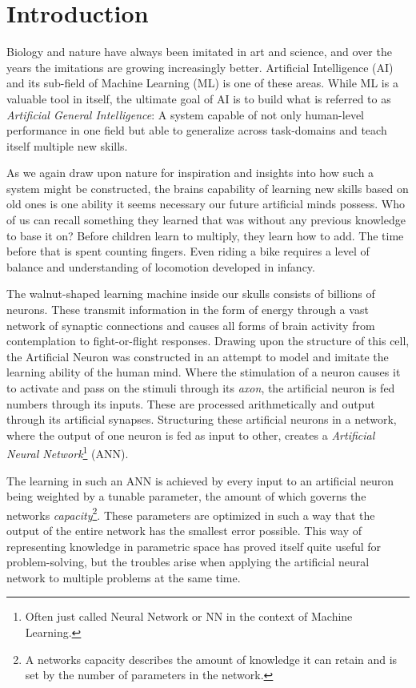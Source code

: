\chapter{Introduction}

Biology and nature have always been imitated in art and science, and over the years the imitations are growing increasingly better. Artificial Intelligence (AI) and its sub-field of Machine Learning (ML) is one of these areas. While ML is a valuable tool in itself, the ultimate goal of AI is to build what is referred to as \textit{Artificial General Intelligence}: A system capable of not only human-level performance in one field but able to generalize across task-domains and teach itself multiple new skills. 

As we again draw upon nature for inspiration and insights into how such a system might be constructed, the brains capability of learning new skills based on old ones is one ability it seems necessary our future artificial minds possess. Who of us can recall something they learned that was without any previous knowledge to base it on? Before children learn to multiply, they learn how to add. The time before that is spent counting fingers. Even riding a bike requires a level of balance and understanding of locomotion developed in infancy.

The walnut-shaped learning machine inside our skulls consists of billions of neurons. These transmit information in the form of energy through a vast network of synaptic connections and causes all forms of brain activity from contemplation to fight-or-flight responses. Drawing upon the structure of this cell, the Artificial Neuron was constructed in an attempt to model and imitate the learning ability of the human mind. Where the stimulation of a neuron causes it to activate and pass on the stimuli through its \textit{axon}, the artificial neuron is fed numbers through its inputs. These are processed arithmetically and output through its artificial synapses. Structuring these artificial neurons in a network, where the output of one neuron is fed as input to other, creates a \textit{Artificial Neural Network}\footnote{Often just called Neural Network or NN in the context of Machine Learning.} (ANN). 

The learning in such an ANN is achieved by every input to an artificial neuron being weighted by a tunable parameter, the amount of which governs the networks \textit{capacity}\footnote{A networks capacity describes the amount of knowledge it can retain and is set by the number of parameters in the network.}. These parameters are optimized in such a way that the output of the entire network has the smallest error possible. This way of representing knowledge in parametric space has proved itself quite useful for problem-solving, but the troubles arise when applying the artificial neural network to multiple problems at the same time.

